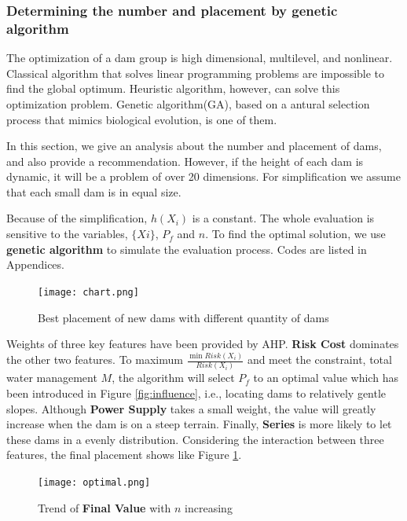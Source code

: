 \documentclass{mcmthesis}
\begin{document}
\subsubsection{Determining the number and placement by genetic algorithm}
The optimization of a dam group is high dimensional, multilevel, and nonlinear. Classical algorithm that solves linear programming problems are  impossible to find the global optimum. Heuristic algorithm, however, can solve this optimization problem. Genetic algorithm(GA), based on a antural selection process that mimics biological evolution, is one of them.

In this section, we give an analysis about the number and placement of dams, and also provide a recommendation. However, if the height of each dam is dynamic, it will be a problem of over 20 dimensions. For simplification we assume that each small dam is in equal size.

Because of the simplification, $h(X_i)$ is a constant. The whole evaluation is sensitive to the variables, $\{Xi\}$, $P_f$ and $n$. To find the optimal solution, we use \textbf{genetic algorithm} to simulate the evaluation process. Codes are listed in Appendices.


\begin{figure}[h]
    \centering
    \texttt{[image: chart.png]}
    \caption{Best placement of new dams with different quantity of dams}
    \label{fig:chart}
\end{figure}
Weights of three key features have been provided by AHP. \textbf{Risk Cost} dominates the other two features. To maximum $\frac{\min Risk(X_i)}{Risk(X_i)}$ and meet the constraint, total water management $M$, the algorithm will select $P_f$ to an optimal value which has been introduced in Figure \ref{fig:influence}, i.e., locating dams to relatively gentle slopes. Although \textbf{Power Supply} takes a small weight, the value will greatly increase when the dam is on a steep terrain. Finally, \textbf{Series} is more likely to let these dams in a evenly distribution. Considering the interaction between three features, the final placement shows like Figure \ref{fig:chart}.
\begin{figure}[h]
    \centering
    \texttt{[image: optimal.png]}
    \caption{Trend of \textbf{Final Value} with $n$ increasing}
    \label{fig:optimal}
\end{figure}
\end{document}
